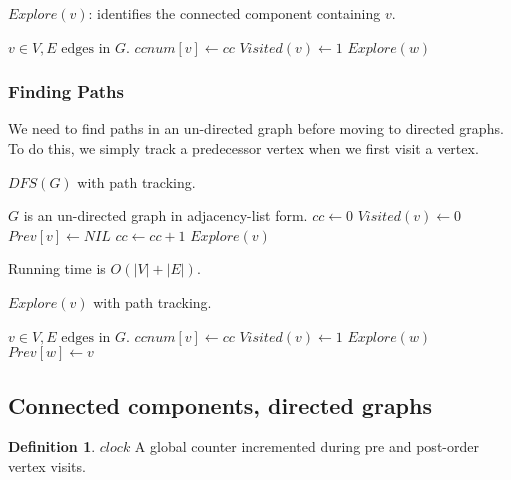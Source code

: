 \documentclass{article}
\theoremstyle{definition}
\newtheorem{definition}{Definition}[section]
\begin{document}
\begin{algorithm}[H]
\caption{$Explore(v)$: identifies the connected component containing $v$.}
\label{alg:dfs_und_exp}
\begin{algorithmic}[1]
\REQUIRE $v \in V, E \text{ edges in } G$.
\STATE $ccnum[v] \gets cc$  
\STATE $Visited(v) \gets 1$
	\STATE $Explore(w)$
\ENDIF
\ENDFOR
\end{algorithmic}
\end{algorithm}

\subsubsection{Finding Paths}
We need to find paths in an un-directed graph before moving to directed graphs. To do this, we simply track a predecessor vertex when we first visit a vertex.

\begin{algorithm}
	\caption{$DFS(G)$ with path tracking.}
	\begin{algorithmic}[1]
		\REQUIRE $G$ is an un-directed graph in adjacency-list form.
		\STATE $cc \gets 0$
		\STATE $Visited(v) \gets 0$
		\STATE $Prev[v] \gets NIL$
		\ENDFOR
		\STATE $cc \gets cc + 1$
		\STATE $Explore(v)$
		\ENDIF
		\ENDFOR
	\end{algorithmic}
	Running time is $O(|V|+|E|)$.
\end{algorithm}

\begin{algorithm}[H]
	\caption{$Explore(v)$ with path tracking.}
	\begin{algorithmic}[1]
		\REQUIRE $v \in V, E \text{ edges in } G$.
		\STATE $ccnum[v] \gets cc$ 
		\STATE $Visited(v) \gets 1$
		\STATE $Explore(w)$
		\STATE $Prev[w] \gets v$
		\ENDIF
		\ENDFOR
	\end{algorithmic}
\end{algorithm}

\subsection{Connected components, directed graphs}
\begin{definition}{$clock$}
A global counter incremented during pre and post-order vertex visits.
\end{definition}
\end{document}
